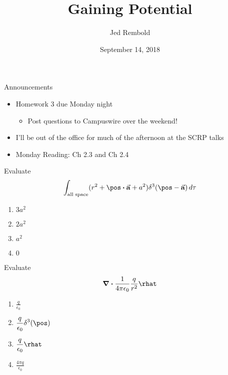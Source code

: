 \documentclass[pdf,aspectratio=169]{beamer}
\title{Gaining Potential}
\date{September 14, 2018}
\author{Jed Rembold}
\begin{document}
\renewcommand{\theenumi}{\Alph{enumi}}

\begin{frame}{Announcements}
	\begin{itemize}
		\item Homework 3 due Monday night
			\begin{itemize}
				\item Post questions to Campuswire over the weekend!
			\end{itemize}
		\item I'll be out of the office for much of the afternoon at the SCRP talks
		\item Monday Reading: Ch 2.3 and Ch 2.4
	\end{itemize}
\end{frame}


\begin{frame}{}
	Evaluate
	\[\int_{\text{all space}}(r^2 + \pos\vdot\va{a} +a^2)\delta^3(\pos-\va{a})\,d\tau\]
	\begin{enumerate}
		\item \alert<2>{$3a^2$}
		\item $2a^2$
		\item $a^2$
		\item $0$
	\end{enumerate}
\end{frame}

\begin{frame}{}
	Evaluate
	\[\div \frac{1}{4\pi\epsilon_0}\frac{q}{r^2}\rhat\]
	\begin{enumerate}
		\item $\displaystyle \frac{q}{\epsilon_0}$
		\item \alert<2>{$\displaystyle \frac{q}{\epsilon_0}\delta^3(\pos)$}
		\item $\displaystyle \frac{q}{\epsilon_0}\rhat$
		\item $\displaystyle \frac{4\pi q}{\epsilon_0}$
	\end{enumerate}
\end{frame}
\end{document}
